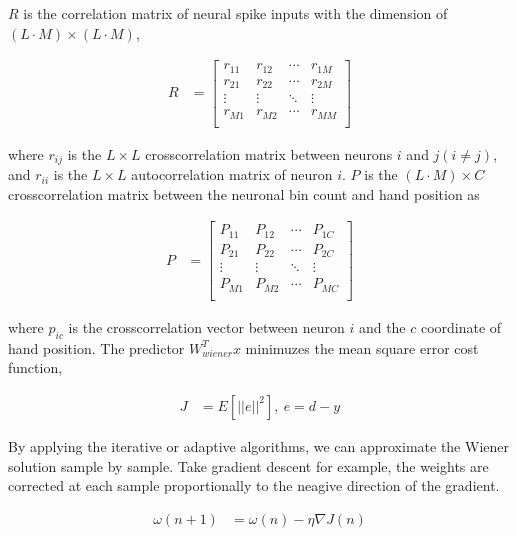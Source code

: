 \documentclass[8pt,a4paper]{article}
\begin{document}
\begin{multicols}{2}
$R$ is the correlation matrix of neural spike inputs with the dimension of $(L \cdot M) \times (L \cdot M)$, 

\begin{align}
  R &= \left[ \begin{array}{cccc}
    r_{11} & r_{12} & \cdots & r_{1M} \\
    r_{21} & r_{22} & \cdots & r_{2M} \\ 
    \vdots & \vdots & \ddots & \vdots \\
    r_{M1} & r_{M2} & \cdots &  r_{MM} \\
    \end{array} 
    \right]
\end{align}

where $r_{ij}$ is the $L \times L$ crosscorrelation matrix between neurons $i$ and $j(i \neq j)$, and $r_{ii}$ is the $ L\times L$ autocorrelation matrix of neuron $i$. 
$P$ is the $(L \cdot M) \times C$ crosscorrelation matrix between the neuronal bin count and hand position as

\begin{align}
  P &= \left[ 
    \begin{array}{cccc}
      P_{11} & P_{12} & \cdots & P_{1C} \\
      P_{21} & P_{22} & \cdots & P_{2C} \\ 
      \vdots & \vdots & \ddots & \vdots \\
      P_{M1} & P_{M2} & \cdots & P_{MC} \\
    \end{array}
  \right]
\end{align}

where $p_{ic}$ is the crosscorrelation vector between neuron $i$ and the $c$ coordinate of hand position. 
The predictor $W_{wiener}^{T} x$ minimuzes the mean square error cost function, 

\begin{align}
  J&= E \left[   \lvert \lvert e   \rvert\rvert^{2}  \right], \ e=d-y
\end{align}

By applying the iterative or adaptive algorithms, we can approximate the Wiener solution sample by sample. 
Take gradient descent for example, the weights are corrected at each sample proportionally to the neagive direction of the gradient. 

\begin{align}
  \omega(n+1)&= \omega(n) -\eta  \nabla J(n)
\end{align}


\end{multicols}
\end{document}
